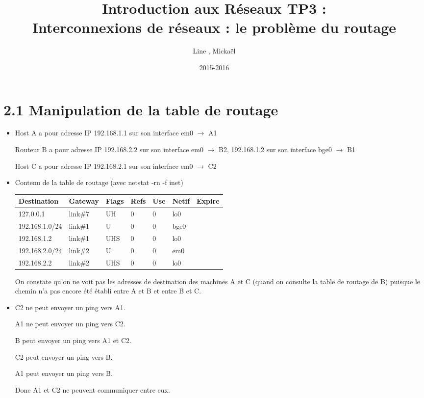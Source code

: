 \documentclass{article}
\title{Introduction aux Réseaux TP3 : \\ Interconnexions de réseaux : le problème du routage}
\author{Line \bsc{POUVARET}, Mickaël \bsc{TURNEL}}
\date{2015-2016}
\begin{document}
\maketitle

\section*{2.1 Manipulation de la table de routage}

\begin{itemize}\renewcommand{\labelitemi}{$\bullet$}
\item Host A a pour adresse IP 192.168.1.1 sur son interface em0 $\rightarrow$ A1

Routeur B a pour adresse IP 192.168.2.2 sur son interface em0 $\rightarrow$ B2, 192.168.1.2 sur son interface bge0 $\rightarrow$ B1

Host C a pour adresse IP 192.168.2.1 sur son interface em0 $\rightarrow$ C2
\item Contenu de la table de routage (avec netstat -rn -f inet)

\begin{tabular}{|p{2cm}|p{2cm}|p{1cm}|p{1cm}|p{1cm}|p{2cm}|p{2cm}|}
\hline
Destination & Gateway & Flags & Refs & Use & Netif & Expire\\
\hline
127.0.0.1 & link\#7 & UH & 0 & 0 & lo0 & \\ 
\hline
192.168.1.0/24 & link\#1 & U & 0 & 0 & bge0 & \\ 
\hline
192.168.1.2 & link\#1 & UHS & 0 & 0 & lo0 & \\ 
\hline
192.168.2.0/24 & link\#2 & U & 0 & 0 & em0 & \\ 
\hline
192.168.2.2 & link\#2 & UHS & 0 & 0 & lo0 & \\ 
\hline
\end{tabular}

On constate qu'on ne voit pas les adresses de destination des machines A et C (quand on consulte la table de routage de B) puisque le chemin n'a pas encore été établi entre A et B et entre B et C.

\item C2 ne peut envoyer un ping vers A1.

A1 ne peut envoyer un ping vers C2.

B peut envoyer un ping vers A1 et C2.

C2 peut envoyer un ping vers B.

A1 peut envoyer un ping vers B.

Donc A1 et C2 ne peuvent communiquer entre eux.


\end{itemize}
\end{document}
